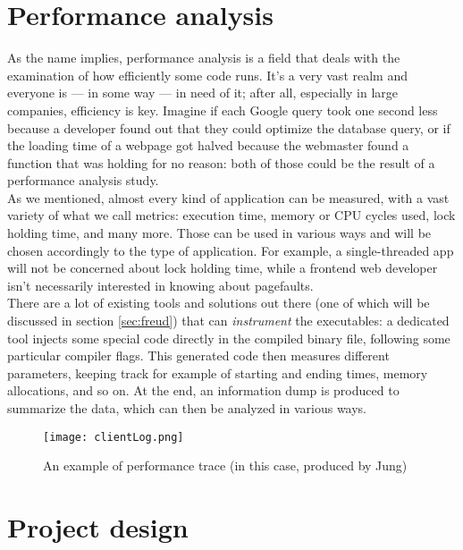 \chapter{Performance analysis}


    As the name implies, performance analysis is a field that deals with the examination of
    how efficiently some code runs. It's a very vast realm and everyone is --- in some
    way --- in need of it; after all, especially in large companies, efficiency is key. Imagine if
    each Google query took one second less because a developer found out that they could
    optimize the database query, or if the loading time of a webpage got halved because the
    webmaster found a function that was holding for no reason: both of those could be the result
    of a performance analysis study.\\

    As we mentioned, almost every kind of application can be measured, with a vast variety of what we call metrics:
    execution time, memory or CPU cycles used, lock holding time, and many more. Those can be used in
    various ways and will be chosen accordingly to the type of application. For example, a single-threaded app
    will not be concerned about lock holding time, while a frontend web developer isn't 
    necessarily interested in knowing about pagefaults.\\

    There are a lot of existing tools and solutions out there (one of which will be discussed in section \ref{sec:freud})
    that can \textit{instrument} the executables: a dedicated tool injects some special code directly in the compiled
    binary file, following some particular compiler flags. This generated code then measures
    different parameters, keeping track for example of starting and ending times, memory allocations, and so on.
    At the end, an information dump is produced to summarize the data, which can then be analyzed in various ways.\\

    \begin{figure}[H]
        \centering
        \texttt{[image: clientLog.png]}
        \caption{An example of performance trace (in this case, produced by Jung)}
        \label{fig:clientLog}
    \end{figure}


\chapter{Project design}

